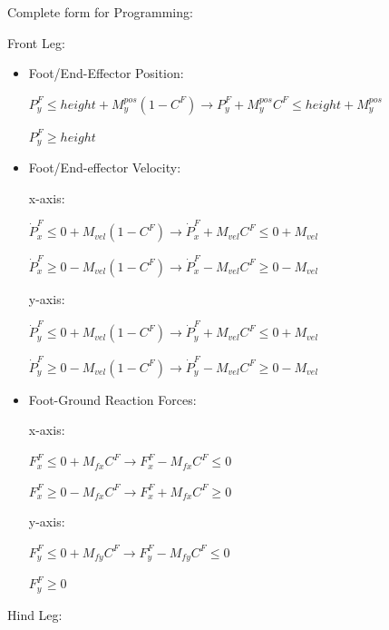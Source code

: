 \documentclass[a4paper,10pt]{article}
\begin{document}
\vspace{3mm}

Complete form for Programming:

Front Leg:

\begin{itemize}
	\item Foot/End-Effector Position:
	
	$P^F_y \leq height + M^{pos}_y(1-C^F) \rightarrow P^F_y +  M^{pos}_yC^F \leq height + M^{pos}_y$
	
	$P^F_y \geq height$
	
	\item Foot/End-effector Velocity:
	
	x-axis:
	
	$\dot{P}^F_x \leq 0 + M_{vel}(1-C^F) \rightarrow \dot{P}^F_x + M_{vel}C^F \leq 0 + M_{vel}$
	
	$\dot{P}^F_x \geq 0 - M_{vel}(1-C^F) \rightarrow \dot{P}^F_x - M_{vel}C^F \geq 0 - M_{vel}$
	
	y-axis:
	
	$\dot{P}^F_y \leq 0 + M_{vel}(1-C^F) \rightarrow \dot{P}^F_y + M_{vel}C^F \leq 0 + M_{vel}$
	
	$\dot{P}^F_y \geq 0 - M_{vel}(1-C^F) \rightarrow \dot{P}^F_y - M_{vel}C^F \geq 0 - M_{vel}$
	
	\item Foot-Ground Reaction Forces:
	
	x-axis:
	
	$F^F_x \leq 0 + M_{fx}C^F \rightarrow F^F_x - M_{fx}C^F \leq 0$
	
	$F^F_x \geq 0 - M_{fx}C^F \rightarrow F^F_x + M_{fx}C^F \geq 0$
	
	y-axis:
	
	$F^F_y \leq 0 + M_{fy}C^F \rightarrow F^F_y - M_{fy}C^F \leq 0$
	
	$F^F_y \geq 0$
	
\end{itemize}

Hind Leg:
\end{document}
